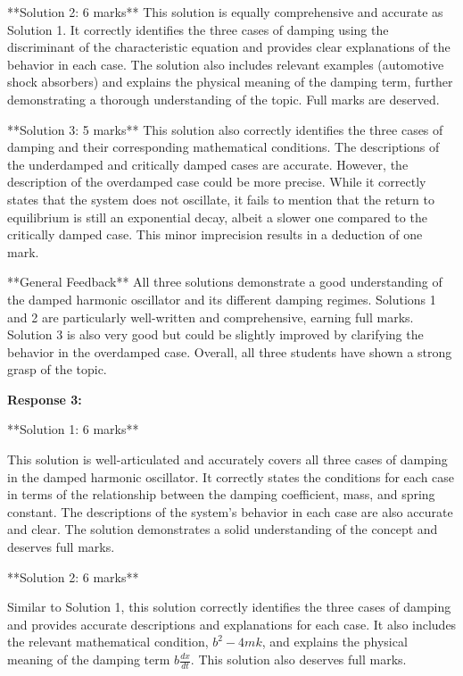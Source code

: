 \documentclass[a4paper,11pt]{article}
\begin{document}
**Solution 2: 6 marks**
This solution is equally comprehensive and accurate as Solution 1. It correctly identifies the three cases of damping using the discriminant of the characteristic equation and provides clear explanations of the behavior in each case. The solution also includes relevant examples (automotive shock absorbers) and explains the physical meaning of the damping term, further demonstrating a thorough understanding of the topic. Full marks are deserved.

**Solution 3: 5 marks**
This solution also correctly identifies the three cases of damping and their corresponding mathematical conditions. The descriptions of the underdamped and critically damped cases are accurate. However, the description of the overdamped case could be more precise. While it correctly states that the system does not oscillate, it fails to mention that the return to equilibrium is still an exponential decay, albeit a slower one compared to the critically damped case. This minor imprecision results in a deduction of one mark.

**General Feedback**
All three solutions demonstrate a good understanding of the damped harmonic oscillator and its different damping regimes. Solutions 1 and 2 are particularly well-written and comprehensive, earning full marks. Solution 3 is also very good but could be slightly improved by clarifying the behavior in the overdamped case. Overall, all three students have shown a strong grasp of the topic.

\bigskip    
\textbf{Response 3:}

**Solution 1: 6 marks**

This solution is well-articulated and accurately covers all three cases of damping in the damped harmonic oscillator. It correctly states the conditions for each case in terms of the relationship between the damping coefficient, mass, and spring constant. The descriptions of the system's behavior in each case are also accurate and clear. The solution demonstrates a solid understanding of the concept and deserves full marks.

**Solution 2: 6 marks**

Similar to Solution 1, this solution correctly identifies the three cases of damping and provides accurate descriptions and explanations for each case. It also includes the relevant mathematical condition, \(b^2 - 4mk\), and explains the physical meaning of the damping term \(b\frac{dx}{dt}\). This solution also deserves full marks.
\end{document}
